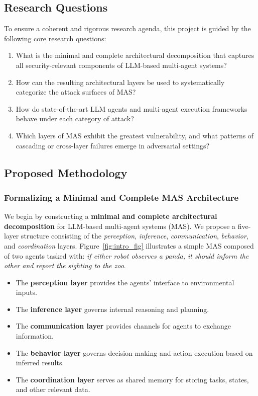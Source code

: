 \subsection{Research Questions}
To ensure a coherent and rigorous research agenda, this project is guided by the following core research questions:

\begin{enumerate}
    \item What is the minimal and complete architectural decomposition that captures all security-relevant components of LLM-based multi-agent systems?
    \item How can the resulting architectural layers be used to systematically categorize the attack surfaces of MAS?
    \item How do state-of-the-art LLM agents and multi-agent execution frameworks behave under each category of attack?
    \item Which layers of MAS exhibit the greatest vulnerability, and what patterns of cascading or cross-layer failures emerge in adversarial settings?
\end{enumerate}

\subsection{Proposed Methodology}
\subsubsection{Formalizing a Minimal and Complete MAS Architecture}

We begin by constructing a \textbf{minimal and complete architectural decomposition} for LLM-based multi-agent systems (MAS). We propose a five-layer structure consisting of the \textit{perception}, \textit{inference}, \textit{communication}, \textit{behavior}, and \textit{coordination} layers. Figure~\ref{fig:intro_fig} illustrates a simple MAS composed of two agents tasked with: \textit{if either robot observes a panda, it should inform the other and report the sighting to the zoo}.  
\begin{itemize}
    \item The \textbf{perception layer} provides the agents' interface to environmental inputs.
    \item The \textbf{inference layer} governs internal reasoning and planning.
    \item The \textbf{communication layer} provides channels for agents to exchange information.
    \item The \textbf{behavior layer} governs decision-making and action execution based on inferred results.
    \item The \textbf{coordination layer} serves as shared memory for storing tasks, states, and other relevant data.
\end{itemize}

